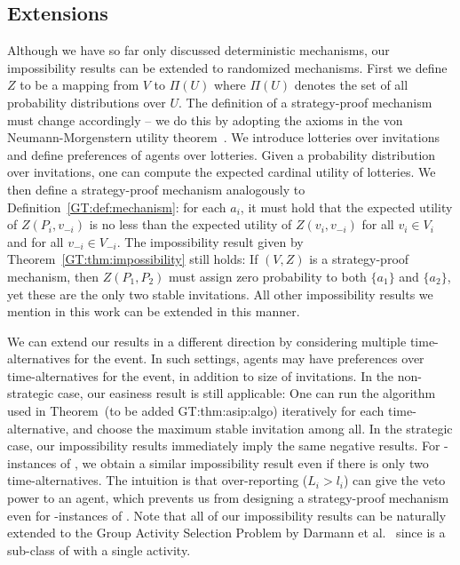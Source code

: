 \subsection{Extensions}\label{GT:sec:asip_extension}
Although we have so far only discussed deterministic mechanisms, our impossibility results can be extended to randomized mechanisms. First we define $Z$ to be a mapping from $V$ to $\Pi(U)$ where $\Pi(U)$ denotes the set of all probability distributions over $U$. The definition of a strategy-proof mechanism must change accordingly -- we do this by adopting the axioms in the von Neumann-Morgenstern utility theorem~\cite{von1947theory}. We introduce lotteries over invitations and define preferences of agents over lotteries. Given a probability distribution over invitations, one can compute the expected cardinal utility of lotteries. We then define a strategy-proof mechanism analogously to Definition~\ref{GT:def:mechanism}: for each $a_i$, it must hold that the expected utility of $Z(P_i, v_{-i})$ is no less than the expected utility of $Z(v_i, v_{-i})$ for all $v_i\in V_i$ and for all $v_{-i} \in V_{-i}$. The impossibility result given by Theorem~\ref{GT:thm:impossibility} still holds: If $(V, Z)$ is a strategy-proof mechanism, then $Z(P_1, P_2)$ must assign zero probability to both $\{a_1\}$ and $\{a_2\}$, yet these are the only two stable invitations.  All other impossibility results we mention in this work can be extended in this manner.

We can extend our results in a different direction by considering multiple time-alternatives for the event. In such settings, agents may have preferences over time-alternatives for the event, in addition to size of invitations.   
In the non-strategic case, our easiness result is still applicable: One can run the algorithm used in Theorem~(to be added  GT:thm:asip:algo) iteratively for each time-alternative, and choose the maximum stable invitation among all.
In the strategic case, our impossibility results immediately imply the same negative results. 
For \INC-instances of \ASIP, we obtain a similar impossibility result even if there is only two time-alternatives. The intuition is that over-reporting ($L_i > l_i$) can give the veto power to an agent, which prevents us from designing a strategy-proof mechanism even for \INC-instances of \ASIP. Note that all of our impossibility results can be naturally extended to the Group Activity Selection Problem by Darmann et al.~\cite{GASP12WINE} since \ASIPs is a sub-class of \GASPs with a single activity.
